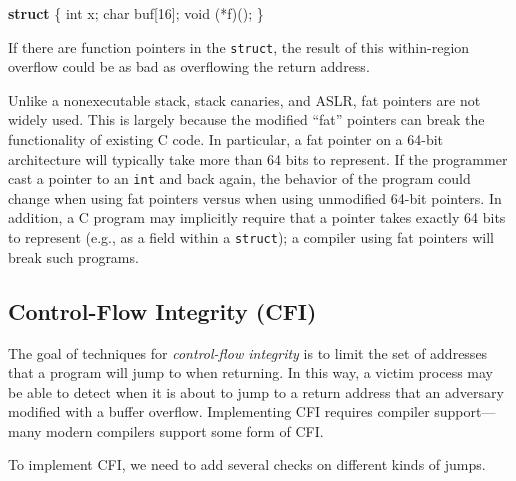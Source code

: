 \documentclass[
  letterpaper,
]{scrbook}
\newenvironment{Shaded}{\begin{snugshade}}{\end{snugshade}}
\newcommand{\DataTypeTok}[1]{\textcolor[rgb]{0.68,0.00,0.00}{#1}}
\newcommand{\DecValTok}[1]{\textcolor[rgb]{0.68,0.00,0.00}{#1}}
\newcommand{\KeywordTok}[1]{\textcolor[rgb]{0.00,0.23,0.31}{\textbf{#1}}}
\newcommand{\NormalTok}[1]{\textcolor[rgb]{0.00,0.23,0.31}{#1}}
\newcommand{\OperatorTok}[1]{\textcolor[rgb]{0.37,0.37,0.37}{#1}}
\newcounter{none} %
\theoremstyle{definition}
\theoremstyle{plain}
\theoremstyle{plain}
\theoremstyle{remark}
\begin{document}
\begin{Shaded}
\begin{Highlighting}[]
          \KeywordTok{struct} \OperatorTok{\{}
            \DataTypeTok{int}\NormalTok{ x}\OperatorTok{;}
            \DataTypeTok{char}\NormalTok{ buf}\OperatorTok{[}\DecValTok{16}\OperatorTok{];}
            \DataTypeTok{void} \OperatorTok{(*}\NormalTok{f}\OperatorTok{)();}
          \OperatorTok{\}}
\end{Highlighting}
\end{Shaded}

If there are function pointers in the \texttt{struct}, the result of
this within-region overflow could be as bad as overflowing the return
address.

Unlike a nonexecutable stack, stack canaries, and ASLR, fat pointers are
not widely used. This is largely because the modified ``fat'' pointers
can break the functionality of existing C code. In particular, a fat
pointer on a 64-bit architecture will typically take more than 64 bits
to represent. If the programmer cast a pointer to an \texttt{int} and
back again, the behavior of the program could change when using fat
pointers versus when using unmodified 64-bit pointers. In addition, a C
program may implicitly require that a pointer takes exactly 64 bits to
represent (e.g., as a field within a \texttt{struct}); a compiler using
fat pointers will break such programs.

\subsection{Control-Flow Integrity
(CFI)}\label{control-flow-integrity-cfi}

The goal of techniques for \emph{control-flow integrity} is to limit the
set of addresses that a program will jump to when returning. In this
way, a victim process may be able to detect when it is about to jump to
a return address that an adversary modified with a buffer overflow.
Implementing CFI requires compiler support---many modern compilers
support some form of CFI.

To implement CFI, we need to add several checks on different kinds of
jumps.
\end{document}

